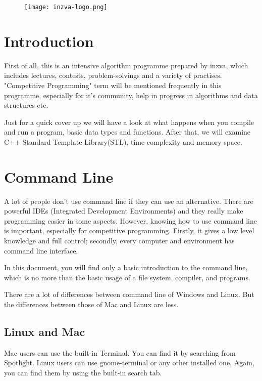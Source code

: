 \documentclass[12pt]{article}
\title{\vspace{-2em}\mytitle\vspace{-0.3em}}
\author{\textbf{Editor}\\Muhammed Burak Bu\u{g}rul\\ \ \\ \textbf{Reviewers} \\ Kadir Emre Oto\\Yusuf Hakan Kalayc{\i} \\ Emin Ers{ü}s}
\date{}
\begin{document}
\begin{figure}
  \centering
  \texttt{[image: inzva-logo.png]}
  \label{fig:inzva}
\end{figure}
\maketitle

\cleardoublepage
\tableofcontents
{}
\cleardoublepage

\section{Introduction}
First of all, this is an intensive algorithm programme prepared by inzva, which includes lectures, contests, problem-solvings and a variety of practises. "Competitive Programming" term will be mentioned frequently in this programme, especially for it's community, help in progress in algorithms and data structures etc. 

Just for a quick cover up we will have a look at what happens when you compile and run a program, basic data types and functions. After that, we will examine C++ Standard Template Library(STL), time complexity and memory space.

\section{Command Line}
A lot of people don't use command line if they can use an alternative. There are powerful IDEs (Integrated Development Environments) and they really make programming easier in some aspects. However, knowing how to use command line is important, especially for competitive programming. Firstly, it gives a low level knowledge and full control; secondly, every computer and environment has command line interface.

In this document, you will find only a basic introduction to the command line, which is no more than the basic usage of a file system, compiler, and programs.

There are a lot of differences between command line of Windows and Linux. But the differences between those of Mac and Linux are less.

\subsection{Linux and Mac}
Mac users can use the built-in Terminal. You can find it by searching from Spotlight. Linux users can use gnome-terminal or any other installed one. Again, you can find them by using the built-in search tab.
\end{document}
